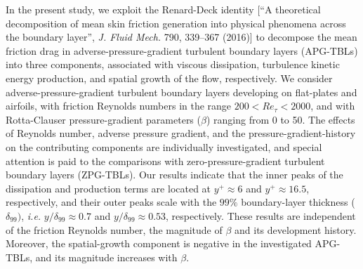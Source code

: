 \begin{paper}

\makepapertitle

%
\begin{paperabstract}
	In the present study, we exploit the Renard-Deck identity [``A theoretical decomposition of mean skin friction generation into physical phenomena across the boundary layer'', {\textit{J. Fluid Mech.}} 790, 339--367 (2016)]  to decompose the mean friction drag in adverse-pressure-gradient turbulent boundary layers (APG-TBLs) into three components, associated with viscous dissipation, turbulence kinetic energy production, and spatial growth of the flow, respectively. We consider adverse-pressure-gradient turbulent boundary layers developing on flat-plates and airfoils, with friction Reynolds numbers in the range $200<Re_\tau<2000$, and with Rotta-Clauser pressure-gradient parameters ($\beta$) ranging from 0 to 50. 
The effects of Reynolds number, adverse pressure gradient, and the pressure-gradient-history on the contributing components are individually investigated, and special attention is paid to the comparisons with zero-pressure-gradient turbulent boundary layers (ZPG-TBLs).
Our results indicate that the inner peaks of the dissipation and production terms are located at $y^+ \approx 6$ and $y^+ \approx 16.5$, respectively, and their outer peaks scale with the $99\%$ boundary-layer thickness ($\delta_{99})$, {\it i.e.} $y/\delta_{99} \approx 0.7$ and $y/\delta_{99} \approx 0.53$, respectively. These results are independent of the friction Reynolds number, the magnitude of $\beta$ and its development history. Moreover, the spatial-growth component is negative in the investigated APG-TBLs, and its magnitude increases with $\beta$. 
\end{paperabstract}


%



%


%

\end{paper}
